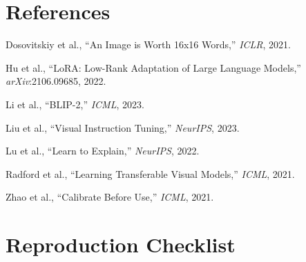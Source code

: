 \documentclass[11pt,twocolumn]{article}
\begin{document}
\section*{References}
\begin{small}
\begin{enumerate}[leftmargin=*, noitemsep, label={[\arabic*]}]
  \item Dosovitskiy et al., ``An Image is Worth 16x16 Words,'' \textit{ICLR}, 2021. \label{dosovitskiy2021vit}
  \item Hu et al., ``LoRA: Low-Rank Adaptation of Large Language Models,'' \textit{arXiv}:2106.09685, 2022. \label{hu2022lora}
  \item Li et al., ``BLIP-2,'' \textit{ICML}, 2023. \label{li2023blip2}
  \item Liu et al., ``Visual Instruction Tuning,'' \textit{NeurIPS}, 2023. \label{liu2023llava}
  \item Lu et al., ``Learn to Explain,'' \textit{NeurIPS}, 2022. \label{lu2022scienceqa}
  \item Radford et al., ``Learning Transferable Visual Models,'' \textit{ICML}, 2021. \label{radford2021clip}
  \item Zhao et al., ``Calibrate Before Use,'' \textit{ICML}, 2021. \label{zhao2021calibrate}
\end{enumerate}
\end{small}

\clearpage
\appendix
\section{Reproduction Checklist}
\label{app:checklist}
\end{document}
